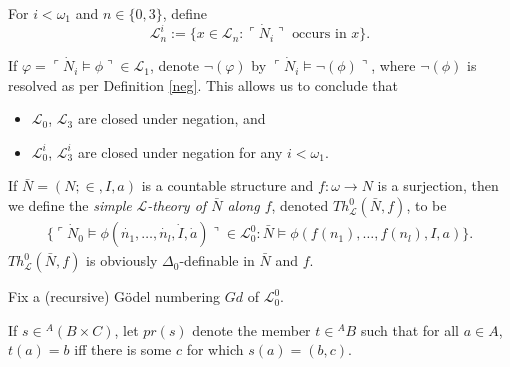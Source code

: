 \documentclass[12pt]{article}
\numberwithin{equation}{section}
\begin{document}
\begin{defi}
For $i < \omega_1$ and $n \in \{0, 3\}$, define 
\begin{equation*}
    \mathcal{L}^i_n := \{x \in \mathcal{L}_n : \ulcorner \dot{N}_i \urcorner \text{ occurs in } x\}.
\end{equation*}
\end{defi}

\begin{con}
If $\varphi = \ulcorner \dot{N}_i \models \phi \urcorner \in \mathcal{L}_1$, denote $\neg(\varphi)$ by $\ulcorner \dot{N}_i \models \neg(\phi) \urcorner$, where $\neg(\phi)$ is resolved as per Definition \ref{neg}. This allows us to conclude that 
\begin{itemize}
    \item $\mathcal{L}_0$, $\mathcal{L}_3$ are closed under negation, and
    \item $\mathcal{L}^i_0$, $\mathcal{L}^i_3$ are closed under negation for any $i < \omega_1$.
\end{itemize}
\end{con}

\begin{defi}
If $\bar{N} = (N; \in, I, a)$ is a countable structure and $f : \omega \longrightarrow N$ is a surjection, then we define the \emph{simple} $\mathcal{L}$\emph{-theory of $\bar{N}$ along $f$}, denoted $Th^{0}_{\mathcal{L}}(\bar{N}, f)$, to be 
\begin{align*}
    \{\ulcorner \dot{N}_0 \models \phi(\dot{n_1}, \ldots, \dot{n_l}, \dot{I}, \dot{a}) \urcorner \in \mathcal{L}^0_0 : \bar{N} \models \phi(f(n_1), \ldots, f(n_l), I, a)\}.
\end{align*}
$Th^{0}_{\mathcal{L}}(\bar{N}, f)$ is obviously $\Delta_0$-definable in $\bar{N}$ and $f$.
\end{defi}

Fix a (recursive) G\"{o}del numbering $Gd$ of $\mathcal{L}^0_0$.

\begin{defi}\label{nota4}
If $s \in {^{A}{(B \times C)}}$, let $pr(s)$ denote the member $t \in {^{A}{B}}$ such that for all $a \in A$, $t(a) = b$ iff there is some $c$ for which $s(a) = (b, c)$.
\end{defi}
\end{document}
